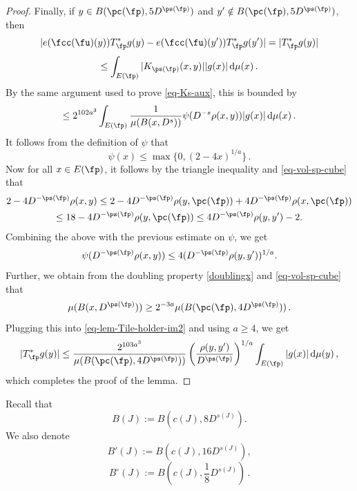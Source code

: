 \begin{proof}
        Finally, if $y \in B(\pc(\fp), 5D^{\ps(\fp)})$ and $y' \notin B(\pc(\fp), 5D^{\ps(\fp)})$, then
        $$
            |e(\fcc(\fu)(y)) T_{\fp}^* g(y) - e(\fcc(\fu)(y')) T_{\fp}^* g(y')| = |T_{\fp}^* g(y)|
        $$
        $$
            \le \int_{E(\fp)} |K_{\ps(\fp)}(x,y)| |g(x)| \, \mathrm{d}\mu(x)\,.
        $$
        By the same argument used to prove \eqref{eq-Ks-aux}, this is bounded by
      \begin{equation}
            \label{eq-lem-Tile-holder-im2}
            \le 2^{102a^3} \int_{E(\fp)} \frac{1}{\mu(B(x, D^s))} \psi(D^{-s} \rho(x,y)) |g(x)| \, \mathrm{d}\mu(x)\,.
        \end{equation}
        It follows from the definition of $\psi$ that
        $$
            \psi(x) \le \max\{0, (2 - 4x)^{1/a}\}\,.
        $$
        Now for all $x\in E(\fp)$, it follows by the triangle inequality and \eqref{eq-vol-sp-cube} that
        \begin{multline*}
        2 - 4D^{-\ps(\fp)}\rho(x,y)\leq 2 - 4D^{-\ps(\fp)}\rho(y, \pc(\fp)) + 4 D^{-\ps(\fp)}\rho(x, \pc(\fp))\\\leq 18 - 4 D^{-\ps(\fp)} \rho(y, \pc(\fp)) \leq 4 D^{-\ps(\fp)}\rho(y,y') - 2 .
        \end{multline*}
        Combining the above with the previous estimate on $\psi$, we get
        $$
            \psi(D^{-\ps(\fp)}\rho(x,y)) \le 4 (D^{-\ps(\fp)}\rho(y,y'))^{1/a}.
        $$
        Further, we obtain from the doubling property \eqref{doublingx} and \eqref{eq-vol-sp-cube} that
        $$
            \mu(B(x, D^{\ps(\fp)})) \ge 2^{-3a} \mu(B(\pc(\fp), 4D^{\ps(\fp)}))\,.
        $$
        Plugging this into \eqref{eq-lem-Tile-holder-im2} and using $a \ge 4$, we get
        $$
            |T_{\fp}^* g(y)| \le \frac{2^{103a^3}}{\mu(B(\pc(\fp), 4D^{\ps(\fp)}))} \left(\frac{\rho(y,y')}{D^{\ps(\fp)}}\right)^{1/a} \int_{E(\fp)} |g(x)| \, \mathrm{d}\mu(y)\,,
        $$
        which completes the proof of the lemma.
    \end{proof}

    Recall that
    \begin{equation*}
        B(J) := B(c(J), 8D^{s(J)}).
    \end{equation*}
    We also denote
    \begin{equation*}
     B'(J) := B(c(J), 16D^{s(J)}),
    \end{equation*}
    \begin{equation*}
     B^\circ{}(J) := B(c(J), \frac{1}{8}D^{s(J)})\, .
    \end{equation*}


